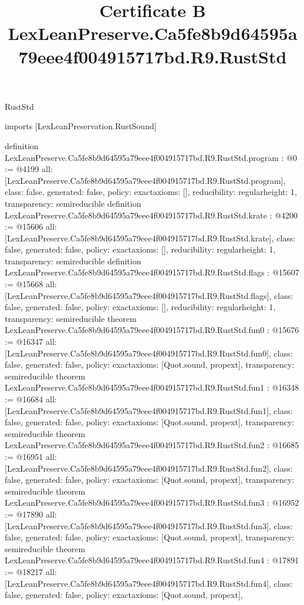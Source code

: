\begin{lexlean}{RustStd}
\title{Certificate B LexLeanPreserve.Ca5fe8b9d64595a79eee4f004915717bd.R9.RustStd}
\begin{coremodule}
imports [LexLeanPreservation.RustSound]

definition LexLeanPreserve.Ca5fe8b9d64595a79eee4f004915717bd.R9.RustStd.program : @0 := @4199 {
  all: [LexLeanPreserve.Ca5fe8b9d64595a79eee4f004915717bd.R9.RustStd.program],
  class: false,
  generated: false,
  policy: exact{axioms: []},
  reducibility: regular{height: 1},
  transparency: semireducible
}
definition LexLeanPreserve.Ca5fe8b9d64595a79eee4f004915717bd.R9.RustStd.krate : @4200 := @15606 {
  all: [LexLeanPreserve.Ca5fe8b9d64595a79eee4f004915717bd.R9.RustStd.krate],
  class: false,
  generated: false,
  policy: exact{axioms: []},
  reducibility: regular{height: 1},
  transparency: semireducible
}
definition LexLeanPreserve.Ca5fe8b9d64595a79eee4f004915717bd.R9.RustStd.flags : @15607 := @15668 {
  all: [LexLeanPreserve.Ca5fe8b9d64595a79eee4f004915717bd.R9.RustStd.flags],
  class: false,
  generated: false,
  policy: exact{axioms: []},
  reducibility: regular{height: 1},
  transparency: semireducible
}
theorem LexLeanPreserve.Ca5fe8b9d64595a79eee4f004915717bd.R9.RustStd.fun0 : @15676 := @16347 {
  all: [LexLeanPreserve.Ca5fe8b9d64595a79eee4f004915717bd.R9.RustStd.fun0],
  class: false,
  generated: false,
  policy: exact{axioms: [Quot.sound, propext]},
  transparency: semireducible
}
theorem LexLeanPreserve.Ca5fe8b9d64595a79eee4f004915717bd.R9.RustStd.fun1 : @16348 := @16684 {
  all: [LexLeanPreserve.Ca5fe8b9d64595a79eee4f004915717bd.R9.RustStd.fun1],
  class: false,
  generated: false,
  policy: exact{axioms: [Quot.sound, propext]},
  transparency: semireducible
}
theorem LexLeanPreserve.Ca5fe8b9d64595a79eee4f004915717bd.R9.RustStd.fun2 : @16685 := @16951 {
  all: [LexLeanPreserve.Ca5fe8b9d64595a79eee4f004915717bd.R9.RustStd.fun2],
  class: false,
  generated: false,
  policy: exact{axioms: [Quot.sound, propext]},
  transparency: semireducible
}
theorem LexLeanPreserve.Ca5fe8b9d64595a79eee4f004915717bd.R9.RustStd.fun3 : @16952 := @17890 {
  all: [LexLeanPreserve.Ca5fe8b9d64595a79eee4f004915717bd.R9.RustStd.fun3],
  class: false,
  generated: false,
  policy: exact{axioms: [Quot.sound, propext]},
  transparency: semireducible
}
theorem LexLeanPreserve.Ca5fe8b9d64595a79eee4f004915717bd.R9.RustStd.fun4 : @17891 := @18217 {
  all: [LexLeanPreserve.Ca5fe8b9d64595a79eee4f004915717bd.R9.RustStd.fun4],
  class: false,
  generated: false,
  policy: exact{axioms: [Quot.sound, propext]},
}
\end{coremodule}
\end{lexlean}
